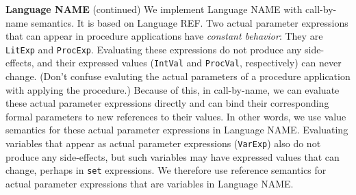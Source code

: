 \begin{minipage}[t]{\sw}
\slidenumber
\LARGE
{\bf Language NAME} (continued)\exx
We implement Language NAME with call-by-name semantics.
It is based on Language REF.\exx
Two actual parameter expressions 
that can appear in procedure applications
have {\em constant behavior}:
They are \verb'LitExp' and \verb'ProcExp'.
Evaluating these expressions do not produce any side-effects,
and their expressed values
(\verb'IntVal' and \verb'ProcVal', respectively) can never change.
(Don't confuse evaluting the actual parameters of a procedure application
with applying the procedure.)
Because of this, in call-by-name,
we can evaluate these actual parameter expressions directly
and can bind their corresponding formal parameters
to new references to their values.
In other words, we use value semantics
for these actual parameter expressions in Language NAME.\exx
Evaluating variables that appear as actual parameter expressions
(\verb'VarExp') also do not produce any side-effects,
but such variables may have expressed values that can change,
perhaps in \verb'set' expressions.
We therefore use reference semantics
for actual parameter expressions that are variables
in Language NAME.
\end{minipage}
\clearpage
